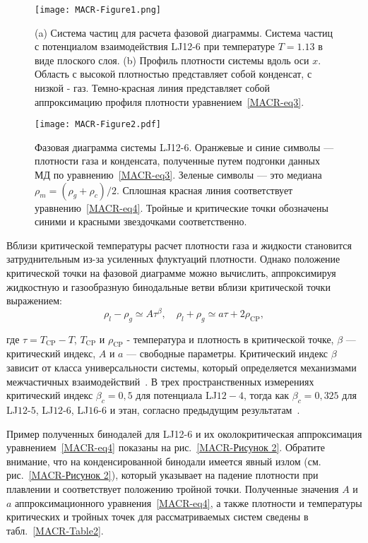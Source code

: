 \begin{figure}[!t]
\centering
 \texttt{[image: MACR-Figure1.png]}
 \caption{(a) Система частиц для расчета фазовой диаграммы. Система частиц с потенциалом взаимодействия LJ12-6 при температуре $T=1.13$ в виде плоского слоя.
   (b) Профиль плотности системы вдоль оси $x$. Область с высокой плотностью представляет собой конденсат, с низкой - газ. Темно-красная линия представляет собой аппроксимацию профиля плотности уравнением~\eqref{MACR-eq3}.}
\label{MACR-Figure1}
\end{figure}


\begin{figure}[!t]
\centering
 \texttt{[image: MACR-Figure2.pdf]}
 \caption{Фазовая диаграмма системы LJ12-6.
  Оранжевые и синие символы — плотности газа и конденсата, полученные путем подгонки данных МД по уравнению~\eqref{MACR-eq3}.
  Зеленые символы — это медиана $\rho_m=(\rho_g+\rho_c)/2$.
  Сплошная красная линия соответствует уравнению~\eqref{MACR-eq4}.
  Тройные и критические точки обозначены синими и красными звездочками соответственно.
 }
\label{MACR-Figure2}
\end{figure}

Вблизи критической температуры расчет плотности газа и жидкости становится затруднительным из-за усиленных флуктуаций плотности.
Однако положение критической точки на фазовой диаграмме можно вычислить, аппроксимируя жидкостную и газообразную бинодальные ветви вблизи критической точки выражением:
\begin{equation}
    \rho_{l}-\rho_{g} \simeq A \tau^{\beta}, \quad \rho_{l}+\rho_{g} \simeq a \tau+2 \rho_{\mathrm{CP}},
\label{MACR-eq4}
\end{equation}

где $\tau=T_{\mathrm{CP}}-T$, $T_{\mathrm{CP}}$ и $\rho_{\mathrm{CP}}$ - температура и плотность в критической точке, $ \beta$ — критический индекс, $A$ и $a$ — свободные параметры.
Критический индекс $\beta$ зависит от класса универсальности системы, который определяется механизмами межчастичных взаимодействий~\cite{10.1103/physrevlett.89.025703}.
В трех пространственных измерениях критический индекс $\beta_c = 0,5$ для потенциала LJ$12-4$, тогда как $\beta_c = 0,325$ для LJ$12$-$5$, LJ$12$-$6$, LJ$16$-$6$ и этан, согласно предыдущим результатам~\cite{10.1021/acs.jced.6b01036,10.1021/jp9072137,10.1103/physrevlett.89.025703}.

Пример полученных бинодалей для LJ12-6 и их околокритическая аппроксимация уравнением~\eqref{MACR-eq4} показаны на рис.~\ref{MACR-Рисунок 2}.
Обратите внимание, что на конденсированной бинодали имеется явный излом (см. рис.~\ref{MACR-Рисунок 2}), который указывает на падение плотности при плавлении и соответствует положению тройной точки.
Полученные значения $A$ и $a$ аппроксимационного уравнения~\eqref{MACR-eq4}, а также плотности и температуры критических и тройных точек для рассматриваемых систем сведены в табл.~\ref{MACR-Table2}.

